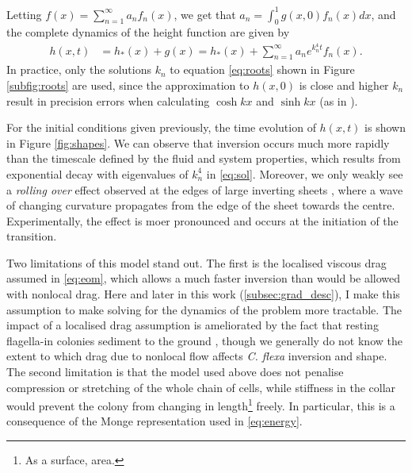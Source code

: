 Letting $f(x) = \sum_{n=1}^\infty a_n f_n(x)$, we get that $a_n = \int_0^1 g(x, 0) f_n(x)dx$, and the complete dynamics of the height function are given by 
\begin{align}
    h(x, t) &= h_*(x) + g(x) = h_*(x) + \sum_{n=1}^\infty a_n e^{k_n^4 t} f_n(x). \label{eq:sol}
\end{align}
\noindent In practice, only the solutions $k_n$ to equation \ref{eq:roots} shown in Figure \ref{subfig:roots} are used, since the approximation to $h(x, 0)$ is close and higher $k_n$ result in precision errors when calculating $\cosh kx$ and $\sinh kx$ (as in \citet{wiggins1998}). 

For the initial conditions given previously, the time evolution of $h(x, t)$ is shown in Figure \ref{fig:shapes}. 
We can observe that inversion occurs much more rapidly than the timescale defined by the fluid and system properties, which results from exponential decay with eigenvalues of $k_n^4$ in \cref{eq:sol}.
Moreover, we only weakly see a \textit{rolling over} effect observed at the edges of large inverting sheets \citep{brunet2019}, where a wave of changing curvature propagates from the edge of the sheet towards the centre.
Experimentally, the effect is moer pronounced and occurs at the initiation of the transition.

Two limitations of this model stand out.
The first is the localised viscous drag assumed in \cref{eq:eom}, which allows a much faster inversion than would be allowed with nonlocal drag.
Here and later in this work (\cref{subsec:grad_desc}), I make this assumption to make solving for the dynamics of the problem more tractable.
The impact of a localised drag assumption is ameliorated by the fact that resting flagella-in colonies sediment to the ground \citep{brunet2019}, though we generally do not know the extent to which drag due to nonlocal flow affects \textit{C. flexa} inversion and shape.
The second limitation is that the model used above does not penalise compression or stretching of the whole chain of cells, while stiffness in the collar would prevent the colony from changing in length\footnote{As a surface, area.} freely.
In particular, this is a consequence of the Monge representation used in \cref{eq:energy}.

